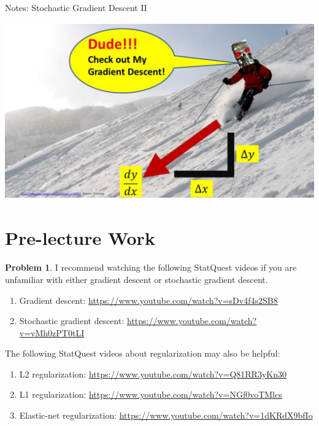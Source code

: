 \documentclass[10pt]{article}
\theoremstyle{definition}
\newtheorem{problem}{Problem}
\begin{document}
\begin{center}
\Huge
Notes: Stochastic Gradient Descent II
\end{center}

\begin{center}
    \includegraphics[height=3in]{skiing.jpg}
\end{center}


\section{Pre-lecture Work}

\begin{problem}
    I recommend watching the following StatQuest videos if you are unfamiliar with either gradient descent or stochastic gradient descent.
    \begin{enumerate}
        \item Gradient descent: \url{https://www.youtube.com/watch?v=sDv4f4s2SB8}
        \item Stochastic gradient descent: \url{https://www.youtube.com/watch?v=vMh0zPT0tLI}
    \end{enumerate}
    The following StatQuest videos about regularization may also be helpful:
    \begin{enumerate}
        \item L2 regularization: \url{https://www.youtube.com/watch?v=Q81RR3yKn30}
        \item L1 regularization: \url{https://www.youtube.com/watch?v=NGf0voTMlcs}
        \item Elastic-net regularization: \url{https://www.youtube.com/watch?v=1dKRdX9bfIo}
    \end{enumerate}
\end{problem}
\end{document}
